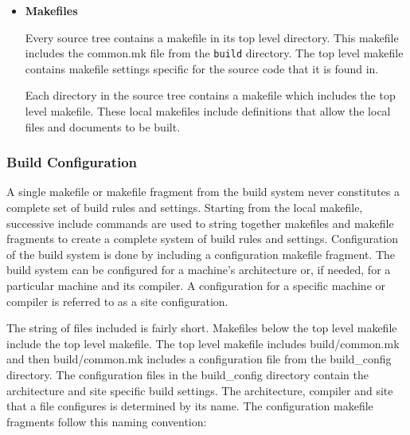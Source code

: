 \begin{itemize}


\item{{\bf Makefiles}}

Every source tree contains a makefile in its top level directory.  This
makefile includes the common.mk file from the {\tt build} directory.
The top level makefile contains makefile settings specific for the
source code that it is found in.

Each directory in the source tree contains a makefile which includes
the top level makefile.  These local makefiles include definitions that
allow the local files and documents to be built.
\end{itemize}

\subsubsection{Build Configuration}

A single makefile or makefile fragment from the build system never
constitutes a complete set of build rules and settings.  Starting from
the local makefile, successive include commands are used to string
together makefiles and makefile fragments to create a complete system
of build rules and settings.  Configuration of the build system is
done by including a configuration makefile fragment.  The build
system can be configured for a machine's architecture or, if needed,
for a particular machine and its compiler. A configuration for a
specific machine or compiler is referred to as a site configuration.

The string of files included is fairly short.  Makefiles below the top
level makefile include the top level makefile. The top level makefile
includes build/common.mk and then build/common.mk includes a
configuration file from the build\_config directory.  The configuration
files in the build\_config directory contain the architecture and site
specific build settings.  The architecture, compiler and site that a file
configures is determined by its name.  The configuration makefile
fragments follow this naming convention:

